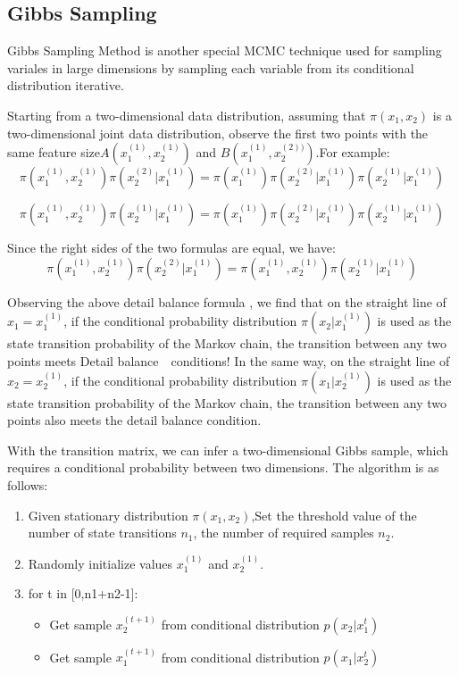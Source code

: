 \subsection{Gibbs Sampling}
Gibbs Sampling Method \cite{bda} is another special MCMC technique used for sampling variales in large dimensions by sampling each variable from its conditional distribution iterative.

Starting from a two-dimensional data distribution, assuming that $\pi(x_1,x_2)$ is a two-dimensional joint data distribution, observe the first two points with the same feature size$A(x_1^{(1)},x_2^{(1)})$ and $B(x_1^{(1)},x_2^{(2))})$.For example:
\[
  \pi(x_1^{(1)},x_2^{(1)})\pi(x_2^{(2)}|x_1^{(1)}) = \pi(x_1^{(1)})\pi(x_2^{(2)}|x_1^{(1)})\pi(x_2^{(1)}|x_1^{(1)})
\]

\[
  \pi(x_1^{(1)},x_2^{(1)})\pi(x_2^{(1)}|x_1^{(1)}) = \pi(x_1^{(1)})\pi(x_2^{(2)}|x_1^{(1)})\pi(x_2^{(1)}|x_1^{(1)})
\]

Since the right sides of the two formulas are equal, we have:
\[
  \pi(x_1^{(1)},x_2^{(1)})\pi(x_2^{(2)}|x_1^{(1)}) =   \pi(x_1^{(1)},x_2^{(1)})\pi(x_2^{(1)}|x_1^{(1)})
\]

Observing the above detail balance formula , we find that on the straight line of $x_1 = x_1^{(1)}$, if the conditional probability distribution $\pi(x_2|x_1^{(1)})$ is used as the state transition probability of the Markov chain, the transition between any two points meets Detail balance　conditions! In the same way, on the straight line of $x_2 = x_2^{(1)}$, if the conditional probability distribution $\pi(x_1|x_2^{(1)})$  is used as the state transition probability of the Markov chain, the transition between any two points also meets the detail balance condition.


With the  transition matrix, we can infer a two-dimensional Gibbs sample, which requires a conditional probability between two dimensions. The algorithm is as follows:
\begin{enumerate}
  \item Given stationary distribution $\pi(x_1,x_2)$,Set the threshold value of the number of state transitions $n_1$, the number of required samples $n_2$.
  \item Randomly initialize values $x_1^{(1)}$ and $x_2^{(1)}$.
  \item for t in [0,n1+n2-1]:
      \begin{itemize}
        \item Get sample $x_2^{(t+1)}$ from conditional distribution $p(x_2|x_1^t)$
        \item Get sample $x_1^{(t+1)}$ from conditional distribution $p(x_1|x_2^t)$
      \end{itemize}
\end{enumerate}
